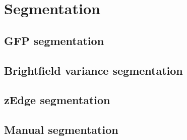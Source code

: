 
\section{Segmentation}

\subsection{GFP segmentation}


\subsection{Brightfield variance segmentation}


\subsection{zEdge segmentation}


\subsection{Manual segmentation}

